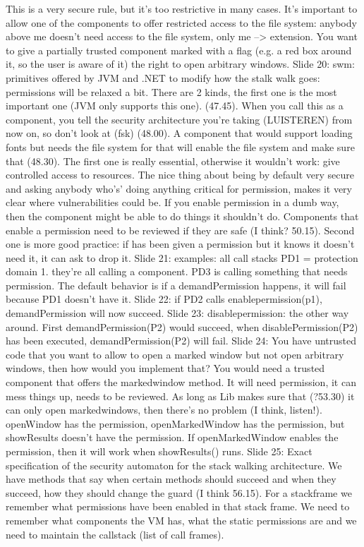 \documentclass[10pt,a4paper]{report}
\begin{document}
This is a very secure rule, but it's too restrictive in many cases. It's important to allow one of the components to offer restricted access to the file system: anybody above me doesn't need access to the file system, only me --> extension.
You want to give a partially trusted component marked with a flag (e.g. a red box around it, so the user is aware of it) the right to open arbitrary windows.
Slide 20: swm: primitives offered by JVM and .NET to modify how the stalk walk goes: permissions will be relaxed a bit. There are 2 kinds, the first one is the most important one (JVM only supports this one). (47.45). When you call this as a component, you tell the security architecture you're taking (LUISTEREN) from now on, so don't look at (fsk) (48.00). A component that would support loading fonts but needs the file system for that will enable the file system and make sure that (48.30).
The first one is really essential, otherwise it wouldn't work: give controlled access to resources. 
The nice thing about being by default very secure and asking anybody who's' doing anything critical for permission, makes it very clear where vulnerabilities could be. If you enable permission in a dumb way, then the component might be able to do things it shouldn't do. 
Components that enable a permission need to be reviewed if they are safe (I think? 50.15).
Second one is more good practice: if has been given a permission but it knows it doesn't need it, it can ask to drop it. 
Slide 21: examples: all call stacks PD1 = protection domain 1. they're all calling a component. PD3 is calling something that needs permission.
The default behavior is if a demandPermission happens, it will fail because PD1 doesn't have it.
Slide 22: if PD2 calls enablepermission(p1), demandPermission will now succeed.
Slide 23: disablepermission: the other way around. First demandPermission(P2) would succeed, when disablePermission(P2) has been executed, demandPermission(P2) will fail.
Slide 24: You have untrusted code that you want to allow to open a marked window but not open arbitrary windows, then how would you implement that? You would need a trusted component that offers the markedwindow method. It will need permission, it can mess things up, needs to be reviewed. As long as Lib makes sure that (?53.30) it can only open markedwindows, then there's no problem (I think, listen!).
openWindow has the permission, openMarkedWindow has the permission, but showResults doesn't have the permission. If openMarkedWindow enables the permission, then it will work when showResults() runs. 
Slide 25: Exact specification of the security automaton for the stack walking architecture. We have methods that say when certain methods should succeed and when they succeed, how they should change the guard (I think 56.15).
For a stackframe we remember what permissions have been enabled in that stack frame.
We need to remember what components the VM has, what the static permissions are and we need to maintain the callstack (list of call frames).
\end{document}

